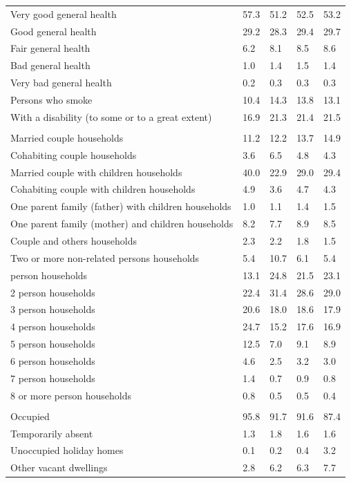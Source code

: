 \documentclass{article}
\begin{document}
\begin{table}[h]
\begin{tabular}{KTTTT}
    \hline
Very good general health & 57.3& 51.2&52.5& 53.2\\
Good general health & 29.2& 28.3& 29.4& 29.7\\
Fair general health & 6.2& 8.1&8.5& 8.6\\
Bad general health & 1.0& 1.4&1.5& 1.4\\
Very bad general health & 0.2& 0.3&0.3& 0.3\\
    \hline
Persons who smoke & 10.4& 14.3&13.8& 13.1\\
    \hline
With a disability (to some or to a great extent) & 16.9& 21.3&21.4& 21.5\\
\hline
    \\ 
    \hline
Married couple households & 11.2& 12.2& 13.7& 14.9\\
Cohabiting couple households & 3.6& 6.5& 4.8& 4.3\\
Married couple with children households & 40.0& 22.9& 29.0& 29.4\\
Cohabiting couple with children households & 4.9& 3.6& 4.7& 4.3\\
One parent family (father) with  children households & 1.0& 1.1& 1.4& 1.5\\
One parent family (mother) and children households & 8.2& 7.7& 8.9& 8.5\\
Couple and others households  & 2.3& 2.2& 1.8& 1.5\\
Two or more non-related persons households &  5.4& 10.7&  6.1&  5.4\\
     person households & 13.1& 24.8& 21.5& 23.1\\
2 person households & 22.4& 31.4& 28.6& 29.0\\
3 person households & 20.6& 18.0& 18.6& 17.9\\
4 person households & 24.7& 15.2& 17.6& 16.9\\
5 person households & 12.5&  7.0&  9.1&  8.9\\
6 person households & 4.6& 2.5& 3.2& 3.0\\
7 person households & 1.4& 0.7& 0.9& 0.8\\
8 or more person households & 0.8& 0.5& 0.5& 0.4\\
\hline
    \\ 
    \hline
Occupied & 95.8& 91.7& 91.6& 87.4\\
Temporarily absent & 1.3& 1.8& 1.6& 1.6\\
Unoccupied holiday homes & 0.1& 0.2& 0.4& 3.2\\
Other vacant dwellings & 2.8& 6.2& 6.3& 7.7\\
\hline
\end{tabular}
\end{table}
\end{document}
